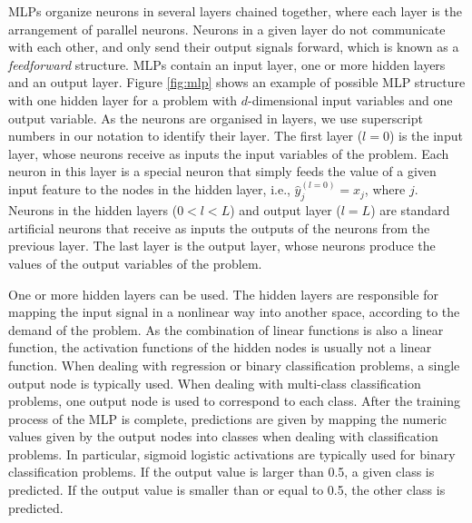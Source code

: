 MLPs organize neurons in several layers chained together, where each layer is the arrangement of parallel neurons. Neurons in a given layer do not communicate with each other, and only send their output signals forward, which is known as a \textit{feedforward} structure. MLPs contain an input layer, one or more hidden layers and an output layer. Figure \ref{fig:mlp} shows an example of possible MLP structure with one hidden layer for a problem with $d$-dimensional input variables and one output variable. As the neurons are organised in layers, we use superscript numbers in our notation to identify their layer. The first layer ($l=0$) is the input layer, whose neurons receive as inputs the input variables of the problem. Each neuron in this layer is a special neuron that simply feeds the value of a given input feature to the nodes in the hidden layer, i.e., $\hat{y}^{(l=0)}_j = x_j$, where $j$. Neurons in the hidden layers ($0<l<L$) and output layer ($l=L$) are standard artificial neurons that receive as inputs the outputs of the neurons from the previous layer. The last layer is the output layer, whose neurons produce the values of the output variables of the problem. 

One or more hidden layers can be used.  The hidden layers are responsible for mapping the input signal in a nonlinear way into another space, according to the demand of the problem. As the combination of linear functions is also a linear function, the activation functions of the hidden nodes is usually not a linear function. When dealing with regression or binary classification problems, a single output node is typically used. When dealing with multi-class classification problems, one output node is used to correspond to each class. After the training process of the MLP is complete, predictions are given by mapping the numeric values given by the output nodes into classes when dealing with classification problems. In particular, sigmoid logistic activations are typically used for binary classification problems. If the output value is larger than 0.5, a given class is predicted. If the output value is smaller than or equal to 0.5, the other class is predicted.  


